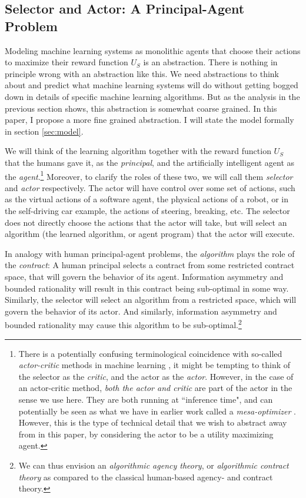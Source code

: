 \subsection{Selector and Actor: A Principal-Agent Problem}\label{sec:existingwork:selectorandactor}

Modeling machine learning systems as monolithic agents that choose their actions to maximize their reward function $U_S$ is an abstraction. There is nothing in principle wrong with an abstraction like this. We need abstractions to think about and predict what machine learning systems will do without getting bogged down in details of specific machine learning algorithms. But as the analysis in the previous section shows, this abstraction is somewhat coarse grained. In this paper, I propose a more fine grained abstraction. I will state the model formally in section \ref{sec:model}.

We will think of the learning algorithm together with the reward function $U_S$ that the humans gave it, as the \textit{principal}, and the artificially intelligent agent as the \textit{agent}.\footnote{There is a potentially confusing terminological coincidence with so-called \textit{actor-critic} methods in machine learning \citep{Peters2005}, it might be tempting to think of the selector as the \textit{critic}, and the actor as the \textit{actor}. However, in the case of an actor-critic method, \textit{both the actor and critic} are part of the actor in the sense we use here. They are both running at ``inference time", and can potentially be seen as what we have in earlier work called a \textit{mesa-optimizer} \citep{Hubinger2019}. However, this is the type of technical detail that we wish to abstract away from in this paper, by considering the actor to be a utility maximizing agent.} Moreover, to clarify the roles of these two, we will call them \textit{selector} and \textit{actor} respectively. The actor will have control over some set of actions, such as the virtual actions of a software agent, the physical actions of a robot, or in the self-driving car example, the actions of steering, breaking, etc. The selector does not directly choose the actions that the actor will take, but will select an algorithm (the learned algorithm, or agent program) that the actor will execute. 





In analogy with human principal-agent problems, the \textit{algorithm} plays the role of the \textit{contract}: A human principal selects a contract from some restricted contract space, that will govern the behavior of its agent. Information asymmetry and bounded rationality will result in this contract being sub-optimal in some way. Similarly, the selector will select an algorithm from a restricted space, which will govern the behavior of its actor. And similarly, information asymmetry and bounded rationality may cause this algorithm to be sub-optimal.\footnote{We can thus envision an \textit{algorithmic agency theory}, or \textit{algorithmic contract theory} as compared to the classical human-based agency- and contract theory. %
} 



